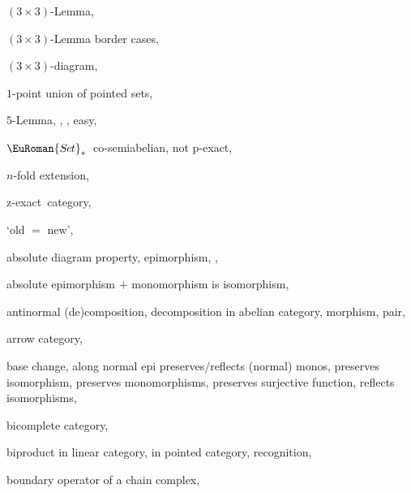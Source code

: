 \documentclass [12pt,oneside]{book}%
\theoremstyle{captionstyle}  %
\newcommand{\SetsBsd}{\EuRoman{S{\kern-0.12ex}e{\hskip-0.14ex}t}_{\ast}\,}	%
\newcommand{\ZExact}{z-exact}									%
\newcommand{\prdct}{\times} 					%
\newcommand{\Prdct}[2]{#1 \times #2}	 	%
\begin{document}
\printindex
\begin{theindex}

    \item $(3\prdct 3)$-Lemma, 
    \item $(\Prdct {3}{3})$-Lemma
    \subitem border cases, 
    \item $(\Prdct {3}{3})$-diagram, 
    \item $1$-point union of pointed sets, 
    \item $5$-Lemma, , , 
    \subitem easy, 
    \item $\SetsBsd $
    \subitem co-semiabelian, 
    \subitem not p-exact, 
    \item $n$-fold extension, 
    \item \ZExact \ category, 
    \item `old $=$ new', 

    \indexspace

    \item absolute
    \subitem diagram property, 
    \subitem epimorphism, , 
    \item absolute epimorphism
    \subitem $+$ monomorphism is isomorphism, 
    \item antinormal
    \subitem (de)composition, 
    \subitem decomposition in abelian category, 
    \subitem morphism, 
    \subitem pair, 
    \item arrow
    \subitem category, 

    \indexspace

    \item base change, 
    \subitem along normal epi preserves/reflects (normal) monos,
    \subitem preserves isomorphism, 
    \subitem preserves monomorphisms, 
    \subitem preserves surjective function, 
    \subitem reflects isomorphisms, 
    \item bicomplete category, 
    \item biproduct
    \subitem in linear category, 
    \subitem in pointed category, 
    \subitem recognition, 
    \item boundary operator of a chain complex, 


\end{theindex}
\end{document}
